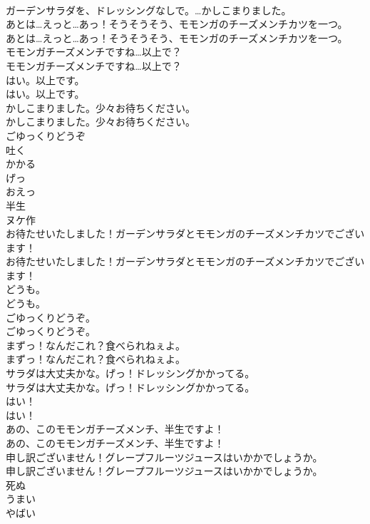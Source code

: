 \documentclass[8pt]{extreport}
\begin{document}
\begin{CJK}{UTF8}{min}
\\	ガーデンサラダを、ドレッシングなしで。…かしこまりました。 
\\	あとは…えっと…あっ！そうそうそう、モモンガのチーズメンチカツを一つ。	
\\	あとは…えっと…あっ！そうそうそう、モモンガのチーズメンチカツを一つ。 
\\	モモンガチーズメンチですね…以上で？	
\\	モモンガチーズメンチですね…以上で？ 
\\	はい。以上です。	
\\	はい。以上です。 
\\	かしこまりました。少々お待ちください。	
\\	かしこまりました。少々お待ちください。 
\\	ごゆっくりどうぞ
\\	吐く
\\	かかる
\\	げっ
\\	おえっ
\\	半生
\\	ヌケ作
\\	お待たせいたしました！ガーデンサラダとモモンガのチーズメンチカツでございます！	
\\	お待たせいたしました！ガーデンサラダとモモンガのチーズメンチカツでございます！ 
\\	どうも。	
\\	どうも。 
\\	ごゆっくりどうぞ。	
\\	ごゆっくりどうぞ。 
\\	まずっ！なんだこれ？食べられねぇよ。	
\\	まずっ！なんだこれ？食べられねぇよ。 
\\	サラダは大丈夫かな。げっ！ドレッシングかかってる。	
\\	サラダは大丈夫かな。げっ！ドレッシングかかってる。 
\\	はい！	
\\	はい！ 
\\	あの、このモモンガチーズメンチ、半生ですよ！	
\\	あの、このモモンガチーズメンチ、半生ですよ！ 
\\	申し訳ございません！グレープフルーツジュースはいかかでしょうか。	
\\	申し訳ございません！グレープフルーツジュースはいかかでしょうか。 
\\	死ぬ
\\	うまい
\\	やばい

\end{CJK}
\end{document}
